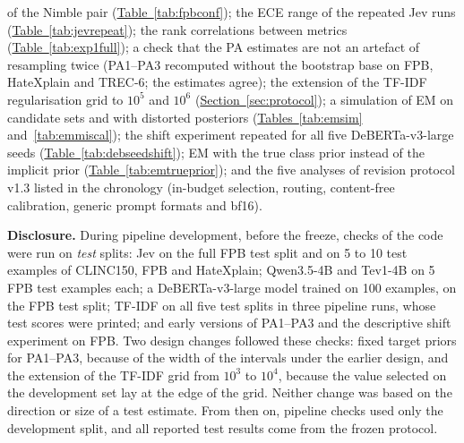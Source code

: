 of the Nimble pair (\hyperref[tab:fpbconf]{Table~\ref*{tab:fpbconf}}); the ECE range of the repeated Jev runs
(\hyperref[tab:jevrepeat]{Table~\ref*{tab:jevrepeat}}); the rank correlations between metrics
(\hyperref[tab:exp1full]{Table~\ref*{tab:exp1full}}); a check that the PA estimates are not an artefact of
resampling twice (PA1--PA3 recomputed without the bootstrap base on FPB, HateXplain and TREC-6; the estimates agree);
the extension of the TF-IDF regularisation grid to $10^5$ and $10^6$
(\hyperref[sec:protocol]{Section~\ref*{sec:protocol}}); a simulation of EM on candidate sets and with distorted
posteriors (\hyperref[tab:emsim]{Tables~\ref*{tab:emsim}} and~\ref{tab:emmiscal}); the shift experiment repeated
for all five DeBERTa-v3-large seeds (\hyperref[tab:debseedshift]{Table~\ref*{tab:debseedshift}}); EM with the true
class prior instead of the implicit prior (\hyperref[tab:emtrueprior]{Table~\ref*{tab:emtrueprior}}); and the five
analyses of revision protocol v1.3 listed in the chronology (in-budget selection, routing, content-free calibration,
generic prompt formats and bf16).

\textbf{Disclosure.} During pipeline development, before the freeze, checks of the code were run on \emph{test}
splits: Jev on the full FPB test split and on 5 to 10 test examples of CLINC150, FPB and HateXplain; Qwen3.5-4B and
Tev1-4B on 5 FPB test examples each; a DeBERTa-v3-large model trained on 100 examples, on the FPB test split; TF-IDF
on all five test splits in three pipeline runs, whose test scores were printed; and early versions of PA1--PA3 and
the descriptive shift experiment on FPB. Two design changes followed these checks: fixed target priors for PA1--PA3,
because of the width of the intervals under the earlier design, and the extension of the TF-IDF grid from $10^3$ to
$10^4$, because the value selected on the development set lay at the edge of the grid. Neither change was based on
the direction or size of a test estimate. From then on, pipeline checks used only the development split, and all reported test results come from the
frozen protocol.

